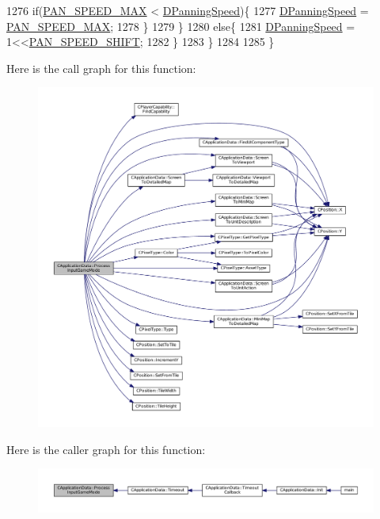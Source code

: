 \begin{DoxyCode}
1276             \textcolor{keywordflow}{if}(\hyperlink{main_8cpp_a33d410346afabd12760fec78db0663fe}{PAN\_SPEED\_MAX} < \hyperlink{classCApplicationData_a9e07e8374b20abfbb57f656e92be8404}{DPanningSpeed})\{
1277                 \hyperlink{classCApplicationData_a9e07e8374b20abfbb57f656e92be8404}{DPanningSpeed} = \hyperlink{main_8cpp_a33d410346afabd12760fec78db0663fe}{PAN\_SPEED\_MAX};
1278             \}
1279         \}
1280         \textcolor{keywordflow}{else}\{
1281             \hyperlink{classCApplicationData_a9e07e8374b20abfbb57f656e92be8404}{DPanningSpeed} = 1<<\hyperlink{main_8cpp_aaf387df20f2ed20a4ec142f9ded9e886}{PAN\_SPEED\_SHIFT};
1282         \}
1283     \}
1284     
1285 \}
\end{DoxyCode}
Here is the call graph for this function\+:
\nopagebreak
\begin{figure}[H]
\begin{center}
\leavevmode
\includegraphics[width=350pt]{classCApplicationData_a018490e670662ed9a9266449516a2ac7_cgraph}
\end{center}
\end{figure}
Here is the caller graph for this function\+:
\nopagebreak
\begin{figure}[H]
\begin{center}
\leavevmode
\includegraphics[width=350pt]{classCApplicationData_a018490e670662ed9a9266449516a2ac7_icgraph}
\end{center}
\end{figure}
\hypertarget{classCApplicationData_a4fb3ad6900161476b5dace2d7cf9908c}{}\label{classCApplicationData_a4fb3ad6900161476b5dace2d7cf9908c} 
